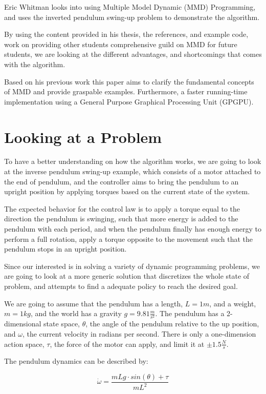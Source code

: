 \documentclass[12pt]{report}
\begin{document}
Eric Whitman looks into using Multiple Model Dynamic (MMD) Programming, and uses the inverted pendulum swing-up problem to demonstrate the algorithm. \cite{eric_thesis}
 
By using the content provided in his thesis, the references, and example code, work on providing other students comprehensive guild on MMD for future students, we are looking at the different advantages, and shortcomings that comes with the algorithm.

Based on his previous work this paper aims to clarify the fundamental concepts of MMD and provide graspable examples. Furthermore, a faster running-time implementation using a General Purpose Graphical Processing Unit (GPGPU).

\section{Looking at a Problem}
To have a better understanding on how the algorithm works, we are going to look at the  inverse pendulum swing-up example, which consists of a motor attached to the end of pendulum, and the controller aims to bring the pendulum to an upright position by applying torques based on the current state of the system. 

The expected behavior for the control law is to apply a torque equal to the direction the pendulum is swinging, such that more energy is added to the pendulum with each period, and when the pendulum finally has enough energy to perform a full rotation, apply a torque opposite to the movement such that the pendulum stops in an upright position.  

Since our interested is in solving a variety of dynamic programming problems, we are going to look at a more generic solution that discretizes the whole state of problem, and attempts to find a adequate policy to reach the desired goal.

We are going to assume that the pendulum has a length, $L=1m$, and a weight, $m=1kg$, and the world has a gravity $g=9.81\frac{m}{s^2}$. The pendulum has a 2-dimensional state space, $\theta$, the angle of the pendulum relative to the up position, and $\omega$, the current velocity in radians per second. There is only a one-dimension action space, $\tau$, the force of the motor can apply, and limit it at $\pm 1.5 \frac{N}{s}$.

The pendulum dynamics can be described by:

\begin{equation} 
\dot{\omega} = \frac{mLg \cdot sin(\theta) + \tau}{mL^2}
\end{equation}
\end{document}
